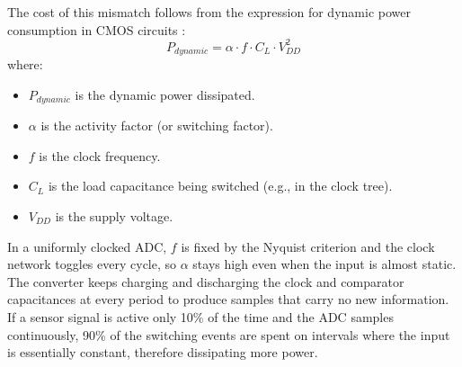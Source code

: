 The cost of this mismatch follows from the expression for dynamic power consumption in CMOS circuits \cite{baker_cmos_2010}:
\begin{equation}
  P_{dynamic} = \alpha \cdot f \cdot C_{L} \cdot V_{DD}^2
\end{equation}
where:
\begin{itemize}
  \item $P_{dynamic}$ is the dynamic power dissipated.
  \item $\alpha$ is the activity factor (or switching factor).
  \item $f$ is the clock frequency.
  \item $C_L$ is the load capacitance being switched (e.g., in the clock tree).
  \item $V_{DD}$ is the supply voltage.
\end{itemize}
 In a uniformly clocked ADC, $f$ is fixed by the Nyquist criterion and the clock network toggles every cycle, so $\alpha$ stays high even when the input is almost static. The converter keeps charging and discharging the clock and comparator capacitances at every period to produce samples that carry no new information. If a sensor signal is active only 10\% of the time and the ADC samples continuously, 90\% of the switching events are spent on intervals where the input is essentially constant, therefore dissipating more power.




